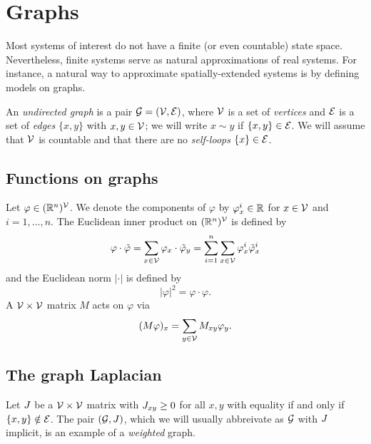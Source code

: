 \section{Graphs}

Most systems of interest do not have a finite (or even countable) state space. Nevertheless, finite systems serve as natural approximations of real systems. For instance, a natural way to approximate spatially-extended systems is by defining models on graphs.

An \emph{undirected graph} is a pair $\mathcal{G} = (\mathcal{V}, \mathcal{E})$, where $\mathcal{V}$ is a set of \emph{vertices} and $\mathcal{E}$ is a set of
\emph{edges} $\{ x, y \}$ with $x, y \in \mathcal{V}$; we will write $x \sim y$ if $\{ x, y \} \in \mathcal{E}$. We will assume that $\mathcal{V}$ is countable and that there are no \emph{self-loops} $\{ x \} \in \mathcal{E}$.


\subsection{Functions on graphs}

Let $\varphi \in ({\mathbb R}^n)^{\mathcal{V}}$. We denote the components of $\varphi$ by
$\varphi^i_x \in {\mathbb R}$ for $x \in \mathcal{V}$ and $i = 1, \ldots, n$. The Euclidean inner product on $({\mathbb R}^n)^{\mathcal{V}}$ is defined by
\begin{equation}
\varphi\cdot\tilde\varphi
  =
\sum_{x\in\mathcal{V}} \varphi_x \cdot \tilde\varphi_y
  =
\sum_{i=1}^n \sum_{x\in\mathcal{V}} \varphi^i_x \tilde\varphi^i_x
\end{equation}
and the Euclidean norm $|\cdot|$ is defined by
\begin{equation}
|\varphi|^2 = \varphi \cdot \varphi.
\end{equation}
A $\mathcal{V}\times\mathcal{V}$ matrix $M$ acts on $\varphi$ via
\begin{equation}
(M \varphi)_x = \sum_{y\in\mathcal{V}} M_{xy} \varphi_y.
\end{equation}


\subsection{The graph Laplacian}

Let $J$ be a $\mathcal{V}\times\mathcal{V}$ matrix with $J_{xy} \ge 0$ for all $x, y$ with equality if and only if $\{ x, y \} \notin \mathcal{E}$. The pair
$(\mathcal{G}, J)$, which we will usually abbreivate as $\mathcal{G}$ with $J$ implicit, is an example of a \emph{weighted} graph.

